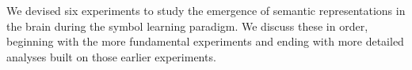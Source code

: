 \label{chapter:experiments}
We devised six experiments to study the emergence of semantic representations in the brain during the symbol learning paradigm. We discuss these in order, beginning with the more fundamental experiments and ending with more detailed analyses built on those earlier experiments.










